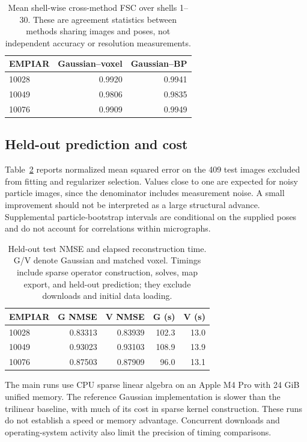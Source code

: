 \begin{table}[t]
\caption{Mean shell-wise cross-method FSC over shells 1--30. These are agreement
statistics between methods sharing images and poses, not independent accuracy
or resolution measurements.}
\label{tab:agreement}\centering\small
\begin{tabular}{lrr}\toprule
EMPIAR & Gaussian--voxel & Gaussian--BP\\\midrule
10028 & 0.9920 & 0.9941 \\
10049 & 0.9806 & 0.9835 \\
10076 & 0.9909 & 0.9949 \\
\bottomrule\end{tabular}\end{table}



\subsection{Held-out prediction and cost}
Table~\ref{tab:prediction} reports normalized mean squared error on the 409 test
images excluded from fitting and regularizer selection. Values close to one are
expected for noisy particle images, since the denominator includes measurement
noise. A small improvement should not be interpreted as a large structural
advance. Supplemental particle-bootstrap intervals are conditional on the
supplied poses and do not account for correlations within micrographs.

\begin{table}[t]
\caption{Held-out test NMSE and elapsed reconstruction time. G/V denote Gaussian
and matched voxel. Timings include sparse operator construction, solves, map
export, and held-out prediction; they exclude downloads and initial data loading.}
\label{tab:prediction}\centering\small
\begin{tabular}{lrrrr}\toprule
EMPIAR & G NMSE & V NMSE & G (s) & V (s)\\\midrule
10028 & 0.83313 & 0.83939 & 102.3 & 13.0 \\
10049 & 0.93023 & 0.93103 & 108.9 & 13.9 \\
10076 & 0.87503 & 0.87909 & 96.0 & 13.1 \\
\bottomrule\end{tabular}\end{table}
The main runs use CPU sparse linear algebra on an Apple M4 Pro with 24 GiB
unified memory. The reference Gaussian implementation is slower than the
trilinear baseline, with much of its cost in sparse kernel construction.
These runs do not establish a speed or memory advantage. Concurrent downloads
and operating-system activity also limit the precision of timing comparisons.

